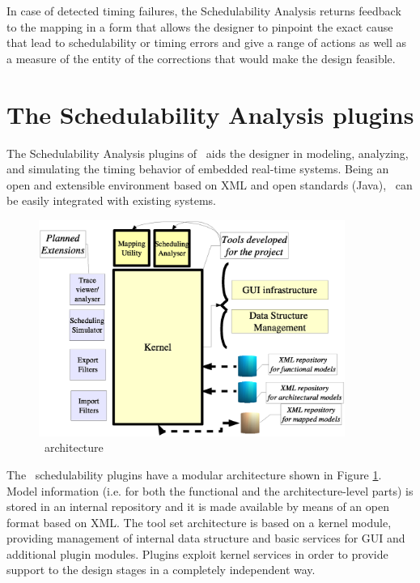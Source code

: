 In case of detected timing failures, the Schedulability Analysis
returns feedback to the mapping in a form that allows the designer to
pinpoint the exact cause that lead to schedulability or timing errors
and give a range of actions as well as a measure of the entity of the
corrections that would make the design feasible.


\section{The Schedulability Analysis plugins}

The Schedulability Analysis plugins of \rtd\ aids the designer in
modeling, analyzing, and simulating the timing behavior of embedded
real-time systems. Being an open and extensible environment based on
XML and open standards (Java), \rtd\ can be easily integrated with
existing systems.

\begin{figure}
\begin{center}
\includegraphics[width=10cm]{images/architecture}
\end{center}
\caption{\rtd\ architecture}
\label{fig:RTDruid-architecture}
\end{figure}


The \rtd\ schedulability plugins have a modular architecture shown in
Figure \ref{fig:RTDruid-architecture}.  Model information (i.e. for
both the functional and the architecture-level parts) is stored in an
internal repository and it is made available by means of an open
format based on XML. The tool set architecture is based on a kernel
module, providing management of internal data structure and basic
services for GUI and additional plugin modules.  Plugins exploit
kernel services in order to provide support to the design stages in a
completely independent way.

